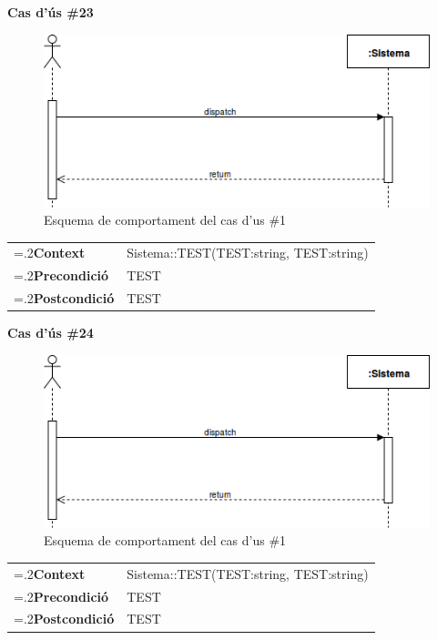 \clearpage
\noindent\textbf{\large Cas d'ús \#23}\\
\begin{figure}[H]
\centering
\includegraphics[scale=0.6]{Figures/casdus_00.png}
\caption{Esquema de comportament del cas d'us \#1}
\end{figure}
\begin{table}[h]
\noindent
\begin{tabularx}{\linewidth}{
>{\hsize=.2\hsize}X%
>{\hsize=0.8\hsize}X%
}
\textbf{Context} 		& Sistema::TEST(TEST:string, TEST:string) \\
\textbf{Precondició} 	& TEST \\
\textbf{Postcondició}	& TEST \\
\end{tabularx}
\label{}
\end{table}

\noindent\textbf{\large Cas d'ús \#24}\\
\begin{figure}[H]
\centering
\includegraphics[scale=0.6]{Figures/casdus_00.png}
\caption{Esquema de comportament del cas d'us \#1}
\end{figure}
\begin{table}[h]
\noindent
\begin{tabularx}{\linewidth}{
>{\hsize=.2\hsize}X%
>{\hsize=0.8\hsize}X%
}
\textbf{Context} 		& Sistema::TEST(TEST:string, TEST:string) \\
\textbf{Precondició} 	& TEST \\
\textbf{Postcondició}	& TEST \\
\end{tabularx}
\label{}
\end{table}

